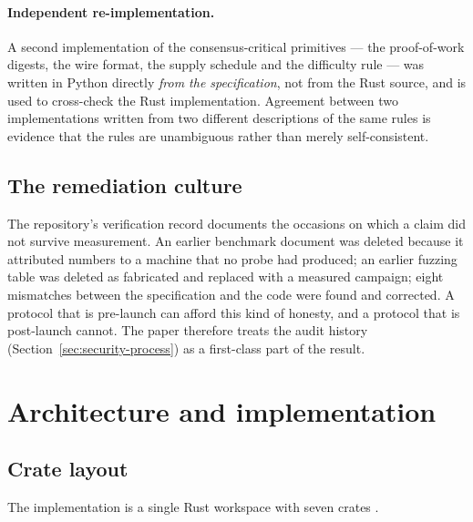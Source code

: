 \documentclass{article}
\begin{document}
\paragraph{Independent re-implementation.} A second implementation of the
consensus-critical primitives --- the proof-of-work digests, the wire format,
the supply schedule and the difficulty rule --- was written in Python directly
\emph{from the specification}, not from the Rust source, and is used to
cross-check the Rust implementation. Agreement between two implementations
written from two different descriptions of the same rules is evidence that the
rules are unambiguous rather than merely self-consistent.

\subsection{The remediation culture}

The repository's verification record \cite{jounit-status} documents the
occasions on which a claim did not survive measurement. An earlier benchmark
document was deleted because it attributed numbers to a machine that no probe
had produced; an earlier fuzzing table was deleted as fabricated and replaced
with a measured campaign; eight mismatches between the specification and the
code were found and corrected. A protocol that is pre-launch can afford this
kind of honesty, and a protocol that is post-launch cannot. The paper therefore
treats the audit history (Section~\ref{sec:security-process}) as a first-class
part of the result.


\section{Architecture and implementation}
\label{sec:architecture}

\subsection{Crate layout}

The implementation is a single Rust workspace with seven crates
\cite{jounit-repo}.
\end{document}
